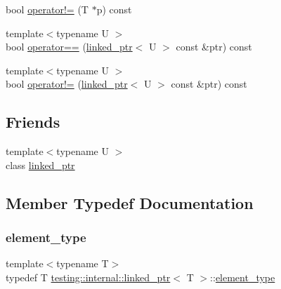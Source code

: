 \begin{DoxyCompactItemize}
\item 
bool \hyperlink{classtesting_1_1internal_1_1linked__ptr_a10305395af92bd2fec7bca085cabc99c}{operator!=} (T $\ast$p) const
\item 
{\footnotesize template$<$typename U $>$ }\\bool \hyperlink{classtesting_1_1internal_1_1linked__ptr_a79306e959a4ae7b3a9da641d2ba06ce6}{operator==} (\hyperlink{classtesting_1_1internal_1_1linked__ptr}{linked\+\_\+ptr}$<$ U $>$ const \&ptr) const
\item 
{\footnotesize template$<$typename U $>$ }\\bool \hyperlink{classtesting_1_1internal_1_1linked__ptr_a4801114a83a9e12b08f90e0d28318f26}{operator!=} (\hyperlink{classtesting_1_1internal_1_1linked__ptr}{linked\+\_\+ptr}$<$ U $>$ const \&ptr) const
\end{DoxyCompactItemize}
\subsection*{Friends}
\begin{DoxyCompactItemize}
\item 
{\footnotesize template$<$typename U $>$ }\\class \hyperlink{classtesting_1_1internal_1_1linked__ptr_a7763f286ca03a7f7363a033d996c8c1c}{linked\+\_\+ptr}
\end{DoxyCompactItemize}


\subsection{Member Typedef Documentation}
\mbox{\label{classtesting_1_1internal_1_1linked__ptr_a295c7d1ee4100d916514c4e4385a0063}} 
\subsubsection{\texorpdfstring{element\+\_\+type}{element\_type}}
{\footnotesize\ttfamily template$<$typename T$>$ \\
typedef T \hyperlink{classtesting_1_1internal_1_1linked__ptr}{testing\+::internal\+::linked\+\_\+ptr}$<$ T $>$\+::\hyperlink{classtesting_1_1internal_1_1linked__ptr_a295c7d1ee4100d916514c4e4385a0063}{element\+\_\+type}}



